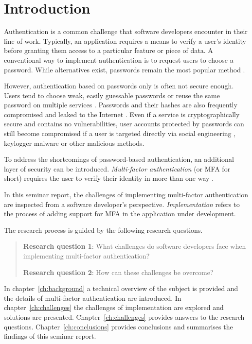 \chapter{Introduction\label{ch:introduction}}

Authentication is a common challenge that software developers encounter in their line of work. Typically, an application requires a means to verify a user's identity before granting them access to a particular feature or piece of data. A conventional way to implement authentication is to request users to choose a password. While alternatives exist, passwords remain the most popular method \citep{zimmermann_password_2020}.

However, authentication based on passwords only is often not secure enough. Users tend to choose weak, easily guessable passwords \citep{shen_user_2016} or reuse the same password on multiple services \citep{zimmermann_password_2020}. Passwords and their hashes are also frequently compromised and leaked to the Internet \citep{alsabah_your_2018}. Even if a service is cryptographically secure and contains no vulnerabilities, user accounts protected by passwords can still become compromised if a user is targeted directly via social engineering \citep{gehl_social_2022}, keylogger malware \citep{singh_keylogger_2021} or other malicious methods.

To address the shortcomings of password-based authentication, an additional layer of security can be introduced. \textit{Multi-factor authentication} (or MFA for short) requires the user to verify their identity in more than one way \citep{owasp_multifactor_2024}.

In this seminar report, the challenges of implementing multi-factor authentication are inspected from a software developer's perspective. \textit{Implementation} refers to the process of adding support for MFA in the application under development.

The research process is guided by the following research questions.

\begin{quote}
    \textbf{Research question 1\label{rq1}}: What challenges do software developers face when implementing multi-factor authentication?

    \textbf{Research question 2\label{rq2}}: How can these challenges be overcome?
\end{quote}

In chapter~\ref{ch:background} a technical overview of the subject is provided and the details of multi-factor authentication are introduced. In chapter~\ref{ch:challenges} the challenges of implementation are explored and solutions are presented. Chapter~\ref{ch:challenges} provides answers to the research questions. Chapter~\ref{ch:conclusions} provides conclusions and summarises the findings of this seminar report.
